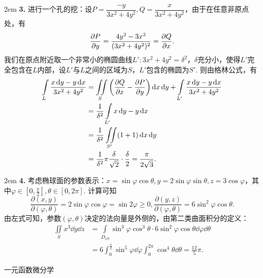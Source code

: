 \documentclass[UTF8,14pt,normal]{ctexart}
\begin{document}
    \hangindent 2em
    \noindent
    \textbf{3.}
    进行一个孔的挖：设\(P=\dfrac{-y}{3x^2+4y^2},Q=\dfrac{x}{3x^2+4y^2}\)，由于在任意非原点处，有\[\pdv{P}{y} = \frac{4y^2-3x^2}{(3x^2+4y^2)^2} = \pdv{Q}{x}.\]
    我们在原点附近取一个非常小的椭圆曲线\(L'\colon 3x^2+4y^2 = \delta^2\)，\(\delta\)充分小，使得\(L'\)完全包含在\(L\)内部，设\(L'\)与\(L\)之间的区域为\(S\)，\(L'\)包含的椭圆为\(S'\). 则由格林公式，有
    \begin{equation*}
        \begin{split}
            \int\limits_{L}\frac{x\dd{y}-y\dd{x}}{3x^2+4y^2} &= \iint\limits_{S}\left(\pdv{Q}{x}-\pdv{P}{y}\right)\dd{x}\dd{y} +\int\limits_{L'}\frac{x\dd{y}-y\dd{x}}{3x^2+4y^2} \\
            &= \frac{1}{\delta^2}\int\limits_{L'}x\dd{y}-y\dd{x}\\
            &= \frac{1}{\delta^2}\iint\limits_{S'}(1+1)\dd{x}\dd{y}\\
            &= \frac{1}{\delta^2}\pi\frac{\delta}{\sqrt{2}} \cdot \frac{\delta}{2} = \frac{\pi}{2\sqrt{3}}.
        \end{split}
    \end{equation*}

    \hangindent 2em
    \noindent
    \textbf{4.}
    考虑椭球面的参数表示：\(x = \sin\varphi\cos\theta, y = 2\sin\varphi\sin\theta, z = 3\cos\varphi\)，其中\(\varphi\in[0,\frac{\pi}{2}],\theta\in[0,2\pi]\).
    计算可知\[\frac{\partial(x,y)}{\partial(\varphi,\theta)} = 2\sin\varphi\cos\varphi = \sin 2\varphi\geqslant0,\frac{\partial (y,z)}{\partial(\varphi,\theta)} = 6\sin^2\varphi\cos\theta.\]
    由左式可知，参数\((\varphi,\theta)\)决定的法向量是外侧的，由第二类曲面积分的定义：
    \begin{equation*}
        \begin{split}
            \iint\limits_{S}x^3\dd{y}\dd{z} &=\int\limits_{D_{\varphi\theta}}\sin^3\varphi\cos^3\theta\cdot 6\sin^2\varphi\cos\theta\dd{\varphi}\dd{\theta}\\
            &= 6\int_{0}^{\frac{\pi}{2}}\sin^5\varphi\dd{\varphi}\int_{0}^{2\pi}\cos^4\theta\dd{\theta} = \frac{12}{5}\pi.
        \end{split}
    \end{equation*}

 一元函数微分学
\end{document}
